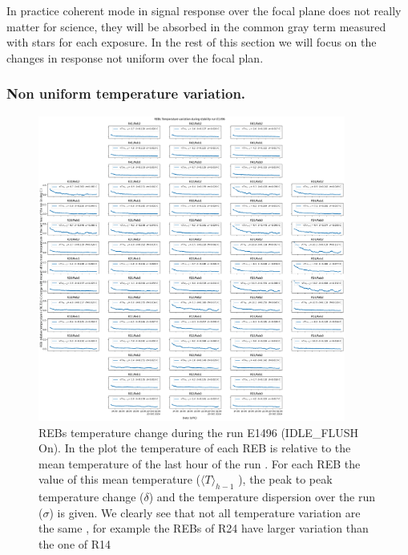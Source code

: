 In practice coherent mode in signal response over the focal plane does not really matter for science, they will be absorbed in the common gray term measured with stars for each exposure. In the rest of this section we will focus on the changes in response not uniform over the focal plan. 

\subsubsection{Non uniform temperature variation.} 

\begin{figure}[ht]
\begin{centering}
\includegraphics[width=0.9\textwidth]{figures/FocalPlanTempRun_E1496.png}
\end{centering}
\caption{REBs temperature change during the run E1496 (IDLE\_FLUSH On). In the plot the temperature of each REB is relative to the mean temperature of the last hour of the run . For each REB the value of this mean temperature ($\langle T \rangle_{h-1}$ ), the peak to peak temperature change ($\delta$) and the temperature dispersion over the run ($\sigma$) is given. We clearly see that not all temperature variation are the same , for example the REBs of R24 have larger variation than the one of R14}   
\label{fig:tempE1496}
\end{figure}
